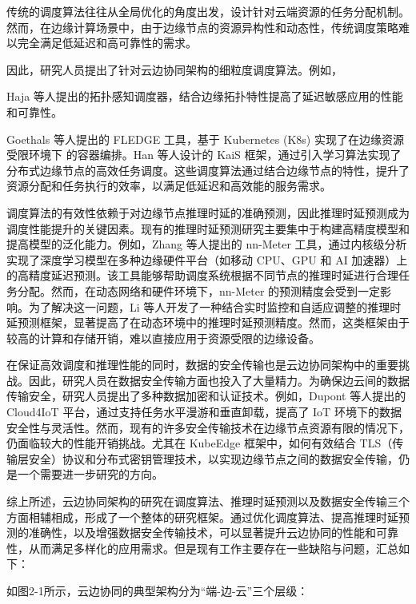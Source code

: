 传统的调度算法往往从全局优化的角度出发，设计针对云端资源的任务分配机制。然而，在边缘计算场景中，由于边缘节点的资源异构性和动态性，传统调度策略难以完全满足低延迟和高可靠性的需求。

因此，研究人员提出了针对云边协同架构的细粒度调度算法。例如，

Haja 等人提出的拓扑感知调度器\cite{haja2019sharpening}，结合边缘拓扑特性提高了延迟敏感应用的性能和可靠性。

Goethals 等人提出的 FLEDGE 工具\cite{goethals2019fledge}，基于 Kubernetes (K8s) 实现了在边缘资源受限环境下
的容器编排。Han 等人设计的 KaiS 框架\cite{han2021tailored}，通过引入学习算法实现了分布式边缘节点的高效任务调度。这些调度算法通过结合边缘节点的特性，提升了资源分配和任务执行的效率，以满足低延迟和高效能的服务需求。

调度算法的有效性依赖于对边缘节点推理时延的准确预测，因此推理时延预测成为调度性能提升的关键因素。现有的推理时延预测研究主要集中于构建高精度模型和提高模型的泛化能力。例如，Zhang 等人提出的 nn-Meter 工具\cite{zhang2021nn}，通过内核级分析实现了深度学习模型在多种边缘硬件平台（如移动 CPU、GPU 和 AI 加速器）上的高精度延迟预测。该工具能够帮助调度系统根据不同节点的推理时延进行合理任务分配。然而，在动态网络和硬件环境下，nn-Meter 的预测精度会受到一定影响。为了解决这一问题，Li 等人开发了一种结合实时监控和自适应调整的推理时延预测框架\cite{li2022inference}，显著提高了在动态环境中的推理时延预测精度。然而，这类框架由于较高的计算和存储开销，难以直接应用于资源受限的边缘设备。

在保证高效调度和推理性能的同时，数据的安全传输也是云边协同架构中的重要挑战。因此，研究人员在数据安全传输方面也投入了大量精力。为确保边云间的数据传输安全，研究人员提出了多种数据加密和认证技术。例如，Dupont 等人提出的 Cloud4IoT 平台\cite{dupont2017edge}，通过支持任务水平漫游和垂直卸载，提高了 IoT 环境下的数据安全性与灵活性。然而，现有的许多安全传输技术在边缘节点资源有限的情况下，仍面临较大的性能开销挑战。尤其在 KubeEdge 框架中，如何有效结合 TLS（传输层安全）协议和分布式密钥管理技术，以实现边缘节点之间的数据安全传输，仍是一个需要进一步研究的方向。


综上所述，云边协同架构的研究在调度算法、推理时延预测以及数据安全传输三个方面相辅相成，形成了一个整体的研究框架。通过优化调度算法、提高推理时延预测的准确性，以及增强数据安全传输技术，可以显著提升云边协同的性能和可靠性，从而满足多样化的应用需求。但是现有工作主要存在一些缺陷与问题，汇总如下：

如图2-1所示，云边协同的典型架构分为“端-边-云”三个层级\cite{mao2017survey,satyanarayanan2017emergence,吴大鹏2018端}：


